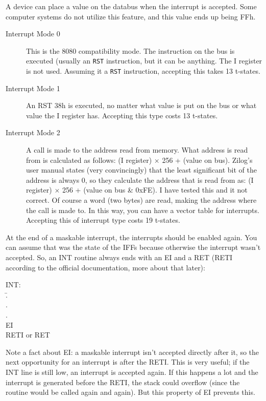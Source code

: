 \documentclass[oneside,a4paper]{book}
\begin{document}
A device can place a value on the databus when the interrupt is accepted. Some computer systems do not utilize this feature, and this value ends up being FFh.

\begin{description}

	\item[Interrupt Mode 0]
	This is the 8080 compatibility mode. The instruction on the bus is executed (usually an {\tt RST} instruction, but it can be anything.  The I register is not used. Assuming it a {\tt RST} instruction, accepting this takes 13 t-states.

	\item[Interrupt Mode 1]
	An RST 38h is executed, no matter what value is put on the bus or what value the I register has. Accepting this type costs 13 t-states.

	\item[Interrupt Mode 2]
	A call is made to the address read from memory. What address is read from is calculated as follows: (I register) $\times$ 256 + (value on bus). Zilog's user manual states (very convincingly) that the least significant bit of the address is always 0, so they calculate the address that is read from as: (I register) $\times$ 256 + (value on bus \& 0xFE). I have tested this and it not correct. Of course a word (two bytes) are read, making the address where the call is made to. In this way, you can have a vector table for interrupts. Accepting this of interrupt type costs 19 t-states.

\end{description}

At the end of a maskable interrupt, the interrupts should be enabled again. You can assume that was the state of the IFFs because otherwise the interrupt wasn't accepted. So, an INT routine always ends with an {\ttfamily EI} and a {\ttfamily RET} ({\ttfamily RETI} according to the official documentation, more about that later):

{\ttfamily
	\begin{tabbing}
		INT:\\
		{\qquad}\=.\\
		\>.\\
		\>.\\
		\>EI\\
		\>RETI {\rmfamily or} RET
	\end{tabbing}
}

Note a fact about {\ttfamily EI}: a maskable interrupt isn't accepted directly after it, so the next opportunity for an interrupt is after the {\ttfamily RETI}. This is very useful; if the INT line is still low, an interrupt is accepted again.  If this happens a lot and the interrupt is generated before the {\ttfamily RETI}, the stack could overflow (since the routine would be called again and again). But this property of {\ttfamily EI} prevents this.
\end{document}
